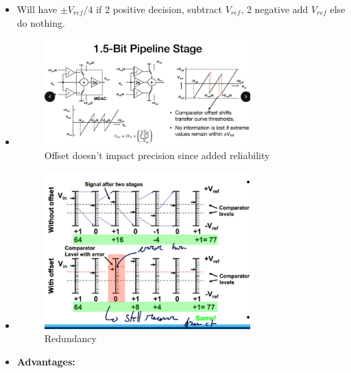 \documentclass[
  a4paper,
]{article}
\begin{document}
\begin{enumerate}
  \begin{itemize}
  \item
    Will have \(\pm V_{ref}/4\) if 2 positive decision, subtract
    \(V_{ref}\), 2 negative add \(V_{ref}\) else do nothing.
  \item
    \begin{figure}
    \centering
    \includegraphics[width=0.75\textwidth,height=\textheight]{image-2.png}
    \caption{Offset doesn't impact precision since added reliability}
    \end{figure}
  \item
    \begin{figure}
    \centering
    \includegraphics[width=0.75\textwidth,height=\textheight]{image-3.png}
    \caption{Redundancy}
    \end{figure}
  \item
    \textbf{Advantages:}


\end{itemize}
\end{enumerate}
\end{document}
